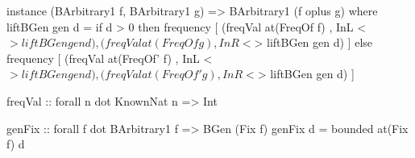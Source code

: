 \begin{code}
instance (BArbitrary1 f, BArbitrary1 g)
  => BArbitrary1 (f oplus g) where
  liftBGen gen d =
    if d > 0
    then frequency
      [ (freqVal  at(FreqOf f) ,  InL <$> liftBGen gen d)
      , (freqVal  at(FreqOf g) ,  InR <$> liftBGen gen d) ]
    else frequency
      [ (freqVal  at(FreqOf' f) ,  InL <$> liftBGen gen d)
      , (freqVal  at(FreqOf' g) ,  InR <$> liftBGen gen d) ]
\end{code}

\begin{code}
freqVal :: forall n dot KnownNat n => Int
\end{code}



\begin{code}
genFix  ::  forall f dot BArbitrary1 f =>  BGen (Fix f)
genFix d = bounded at(Fix f) d
\end{code}

